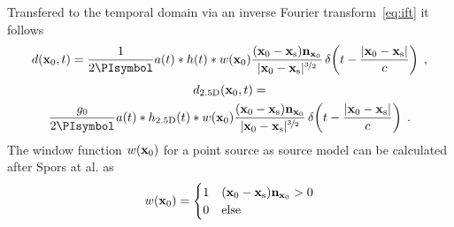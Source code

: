 Transfered to the temporal domain via an inverse Fourier transform~\eqref{eq:ift} it follows
%
\begin{equation}
    d(\x_0,t) = \frac{1}{2\PI} a(t) * h(t) * w(\x_0)
    \frac{(\x_0-\xs)\n_{\x_0}}{|\x_0-\xs|^{\nicefrac{3}{2}}}
    \deltafunc{t-\frac{|\x_0-\xs|}{c}} \qc
    \label{eq:d_wfs_ps}
\end{equation}
%
\begin{multline}
    d_\twohalfD(\x_0,t) = \\
    \frac{g_0}{2\PI} a(t) * h_\twohalfD(t) * w(\x_0)
    \frac{(\x_0-\xs)\n_{\x_0}}{|\x_0-\xs|^{\nicefrac{3}{2}}}
    \deltafunc{t-\frac{|\x_0-\xs|}{c}} \qp
    \label{eq:d_wfs_ps_25D}
\end{multline}
%
The window function $w(\mathbf{x}_0)$ for a point source as source model can be
calculated after Spors at al. as\autocite{Spors2008}
%
\begin{equation}
    w(\x_0) = 
    \begin{cases}
        1 & (\x_0-\xs) \n_{\x_0} > 0 \\
        0 & \text{else}
    \end{cases}
    \label{eq:w_ps}
\end{equation}
%


